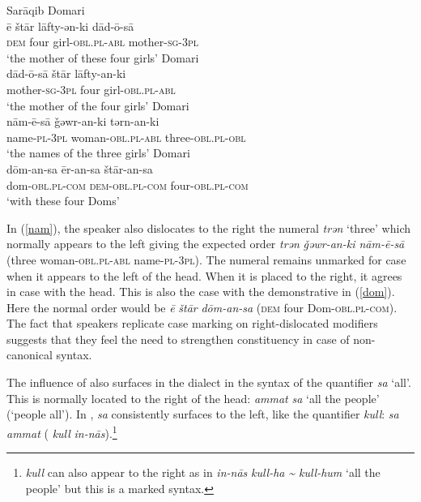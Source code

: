 \documentclass[output=paper]{langsci/langscibook}
\begin{document}
\ea
{Sarāqib Domari}\\ \label{star}
\gll ē štār lāfty-ən-ki dād-ō-sā\\
     \textsc{dem} four girl-\textsc{obl.pl-abl} mother-\textsc{sg-3pl}\\
\glt ‘the mother of these four girls’
\ex \label{dad}
{ Domari}\\
\gll dād-ō-sā štār lāfty-an-ki\\
     mother-\textsc{sg-3pl} four girl-\textsc{obl.pl-abl}\\
\glt ‘the mother of the four girls’
\ex  \label{nam}
{ Domari}\\
\gll nām-ē-sā \v{g}əwr-an-ki tərn-an-ki\\
     name-\textsc{pl-3pl} woman-\textsc{obl.pl-abl} three-\textsc{obl.pl-obl}\\
\glt ‘the names of the three girls’
\ex \label{dom}
{ Domari}\\
\gll dōm-an-sa ēr-an-sa štār-an-sa\\
     dom-\textsc{obl.pl-com} \textsc{dem-obl.pl-com} four-\textsc{obl.pl-com}\\
\glt ‘with these four Doms’
\z

In (\ref{nam}), the speaker also dislocates to the right the numeral \textit{trən} ‘three’ which normally appears to the left giving the expected order \textit{trən} \textit{\v{g}əwr-an-ki nām-ē-sā} (three woman-\textsc{obl}.\textsc{pl}{}-\textsc{abl} name-\textsc{pl}{}-\textsc{3pl}). The numeral remains unmarked for case when it appears to the left of the head. When it is placed to the right, it agrees in case with the head. This is also the case with the demonstrative in (\ref{dom}). Here the normal order would be \textit{ē} \textit{štār} \textit{dōm-an-sa} (\textsc{dem} four Dom-\textsc{obl.pl}{}-\textsc{com}). The fact that speakers replicate case marking on right-dislocated modifiers suggests that they feel the need to strengthen constituency in case of non-canonical syntax.

The influence of  also surfaces in the  dialect in the syntax of the {quantifier} \textit{sa} ‘all’. This is normally located to the right of the head: \textit{ammat} \textit{sa} ‘all the people’ (`people all'). In , \textit{sa} consistently surfaces to the left, like the  {quantifier} \textit{kull}: \textit{sa} \textit{ammat} ( \textit{kull} \textit{in-nās}).\footnote{ \textit{kull} can also appear to the right as in \textit{in-nās} \textit{kull-ha} \textit{{\textasciitilde} kull-hum} ‘all the people’ but this is a marked syntax.}
\end{document}
